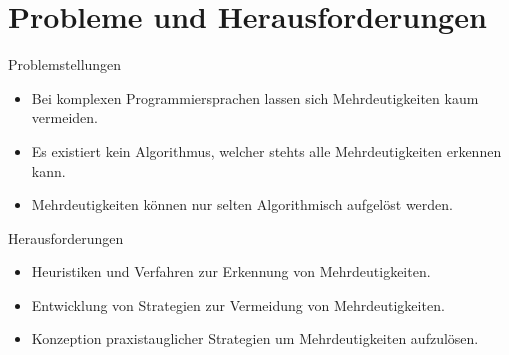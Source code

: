 \documentclass[t]{beamer}
\begin{document}
	\section{Probleme und Herausforderungen}\label{sec:probleme-und-herausforderungen}
	\begin{frame}
		\begin{block}{Problemstellungen}
			\begin{itemize}
				\item Bei komplexen Programmiersprachen lassen sich Mehrdeutigkeiten kaum vermeiden.
				\item Es existiert kein Algorithmus, welcher stehts alle Mehrdeutigkeiten erkennen kann.\cite{springer2013}
				\item Mehrdeutigkeiten können nur selten Algorithmisch aufgelöst werden.
			\end{itemize}
		\end{block}
		\vspace{2em}
		\begin{block}{Herausforderungen}
			\begin{itemize}
				\item Heuristiken und Verfahren zur Erkennung von Mehrdeutigkeiten.
				\item Entwicklung von Strategien zur Vermeidung von Mehrdeutigkeiten.
				\item Konzeption praxistauglicher Strategien um Mehrdeutigkeiten aufzulösen.
			\end{itemize}
		\end{block}
	\end{frame}
\end{document}

